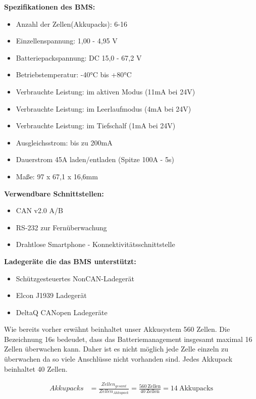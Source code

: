 \newpage
\textbf{Spezifikationen des BMS:}
\begin{itemize}
\item {Anzahl der Zellen(Akkupacks): 6-16}
\item {Einzellenspannung: 1,00 - 4,95 V}
\item {Batteriepackspannung: DC 15,0 - 67,2 V}
\item {Betriebstemperatur: -40°C bis +80°C}
\item {Verbrauchte Leistung: im aktiven Modus (11mA bei 24V)}
\item {Verbrauchte Leistung: im Leerlaufmodus (4mA bei 24V)}
\item {Verbrauchte Leistung: im Tiefschalf (1mA bei 24V)}
\item {Ausgleichsstrom: bis zu 200mA}
\item {Dauerstrom 45A laden/entladen (Spitze 100A - 5s)}
\item {Maße: 97 x 67,1 x 16,6mm}
\end{itemize}


\textbf{Verwendbare Schnittstellen:}
\begin{itemize}
\item {CAN v2.0 A/B}
\item {RS-232 zur Fernüberwachung}
\item {Drahtlose Smartphone - Konnektivitätsschnittstelle}
\end{itemize}


\textbf{Ladegeräte die das BMS unterstützt:}
\begin{itemize}
\item {Schützgesteuertes NonCAN-Ladegerät}
\item {Elcon J1939 Ladegerät}
\item {DeltaQ CANopen Ladegeräte}
\end{itemize}

Wie bereits vorher erwähnt beinhaltet unser Akkusystem 560 Zellen. Die Bezeichnung 16s bedeudet, dass das Batteriemanagement insgesamt maximal 16 Zellen überwachen kann. Daher ist es nicht möglich jede Zelle einzeln zu überwachen da so viele Anschlüsse nicht vorhanden sind. Jedes Akkupack beinhaltet 40 Zellen.

\begin{align*}
Akkupacks &= \frac{Zellen_{gesamt}}{Zellen_{Akkupack}} = \frac{560~\mathrm{Zellen}}{40~\mathrm{Zellen}} = 14~\mathrm{Akkupacks}\\
\end{align*}

\newpage

